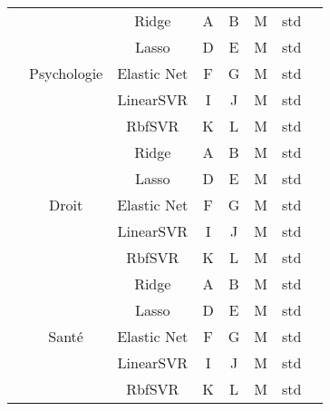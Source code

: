 \documentclass[11pt]{article}
\begin{document}
\begin{table}[!htbp]
\begin{center}
\begin{tabular}{|c|c|c|c|c|c|c|c|}
			&&Ridge&A&B&M&std& \\
			\cline{3-8}
			&&Lasso&D&E&M&std& \\
			\cline{3-8}
			&Psychologie&Elastic Net&F&G&M&std& \\
			\cline{3-8}
			&&LinearSVR&I&J&M&std& \\
			\cline{3-8}
			&&RbfSVR&K&L&M&std& \\
			\cline{1-8}
				\multirow{5}{*}{}
			&&Ridge&A&B&M&std& \\
			\cline{3-8}
			&&Lasso&D&E&M&std& \\
			\cline{3-8}
			&Droit&Elastic Net&F&G&M&std& \\
			\cline{3-8}
			&&LinearSVR&I&J&M&std& \\
			\cline{3-8}
			&&RbfSVR&K&L&M&std& \\
			\cline{1-8}
				\multirow{5}{*}{}
			&&Ridge&A&B&M&std& \\
			\cline{3-8}
			&&Lasso&D&E&M&std& \\
			\cline{3-8}
			&Santé&Elastic Net&F&G&M&std& \\
			\cline{3-8}
			&&LinearSVR&I&J&M&std& \\
			\cline{3-8}
			&&RbfSVR&K&L&M&std& \\
			\cline{1-8}
		\end{tabular}
	\end{center}
	\label{tab:multicol}
\end{table}
\end{document}
